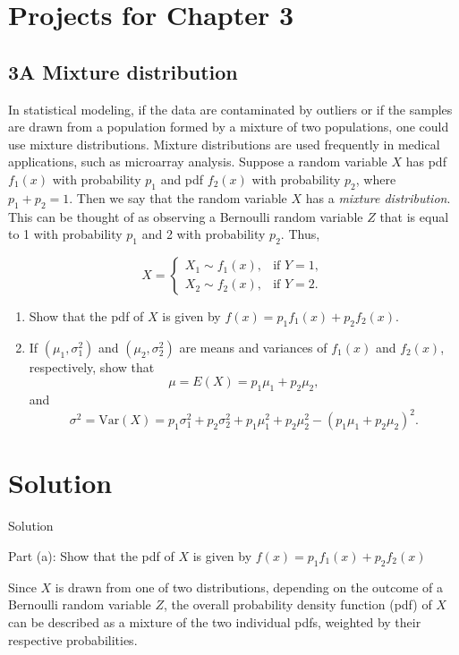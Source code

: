 \documentclass{article}
\begin{document}
\section*{Projects for Chapter 3}
\subsection*{3A Mixture distribution}

In statistical modeling, if the data are contaminated by outliers or if the samples are drawn from a population formed by a mixture of two populations, one could use mixture distributions. Mixture distributions are used frequently in medical applications, such as microarray analysis. Suppose a random variable \(X\) has pdf \(f_1(x)\) with probability \(p_1\) and pdf \(f_2(x)\) with probability \(p_2\), where \(p_1 + p_2 = 1\). Then we say that the random variable \(X\) has a \textit{mixture distribution}. This can be thought of as observing a Bernoulli random variable \(Z\) that is equal to 1 with probability \(p_1\) and 2 with probability \(p_2\). Thus,

\[
X =
\begin{cases}
X_1 \sim f_1(x), & \text{if } Y = 1, \\
X_2 \sim f_2(x), & \text{if } Y = 2.
\end{cases}
\]

\begin{enumerate}
    \item[(a)] Show that the pdf of \(X\) is given by \(f(x) = p_1f_1(x) + p_2f_2(x)\).
    
    \item[(b)] If \((\mu_1, \sigma_1^2)\) and \((\mu_2, \sigma_2^2)\) are means and variances of \(f_1(x)\) and \(f_2(x)\), respectively, show that
    \[
    \mu = E(X) = p_1\mu_1 + p_2\mu_2,
    \]
    and
    \[
    \sigma^2 = \text{Var}(X) = p_1\sigma_1^2 + p_2\sigma_2^2 + p_1\mu_1^2 + p_2\mu_2^2 - (p_1\mu_1 + p_2\mu_2)^2.
    \]
\end{enumerate}

\section*{Solution}

Solution

Part (a): Show that the pdf of \(X\) is given by \(f(x) = p_1f_1(x) + p_2f_2(x)\)

Since \(X\) is drawn from one of two distributions, depending on the outcome of a Bernoulli random variable \(Z\), the overall probability density function (pdf) of \(X\) can be described as a mixture of the two individual pdfs, weighted by their respective probabilities.
\end{document}
